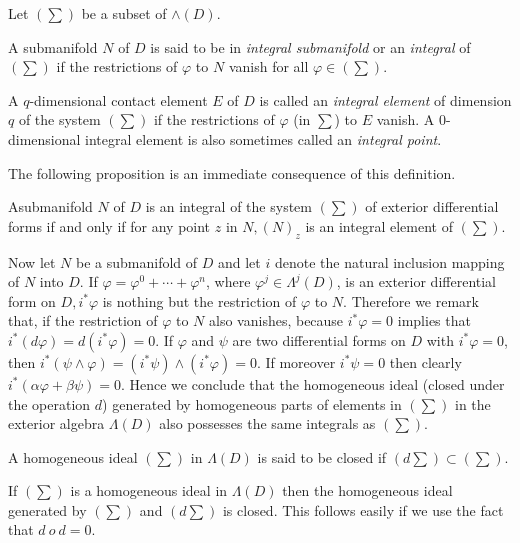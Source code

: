 Let $(\sum)$ be a subset of $\wedge (D)$.

\begin{defi*} %
  A submanifold $N$ of $D$ is said to be in {\em{integral
      submanifold}} or an {\em{integral}} of $(\sum)$ if the
  restrictions of $\varphi$ to $N$ vanish for all $\varphi \in
  (\sum)$. 
\end{defi*}

\begin{defi*}%
  A $q$-dimensional contact element $E$ of $D$ is called an
  {\em{integral element}} of dimension $q$ of the system $(\sum)$ if
  the restrictions of $\varphi $ (in $\sum$) to $E$ vanish. A
  0-dimensional integral element is also sometimes called an
  {\em{integral point}}.  
\end{defi*}

The following proposition is an immediate consequence of this definition.
\setcounter{proposition}{0}
\begin{proposition}\label{chap2:sec2.2:prop1}%
  A\pageoriginale submanifold $N$ of $D$ is an integral of the system $(\sum)$ of
  exterior differential forms if and only if for any point $z$ in $N,
  (N)_z$ is an integral element of $(\sum)$. 
\end{proposition}

Now let $N$ be a submanifold of $D$ and let $i$ denote the natural
inclusion mapping of $N$ into $D$. If $\varphi = \varphi^0 + \cdots +
\varphi^n$,  where $\varphi^j \in \Lambda^j (D)$,  is an exterior
differential form on $D,  i^* \varphi$ is nothing but the restriction
of $\varphi$ to $N$. Therefore we remark that,  if the restriction of
$\varphi$ to $N$ also  vanishes,  because $i^* \varphi = 0$ implies
that $i^* (d \varphi) = d(i^* \varphi) = 0$. If $\varphi$ and $\psi$
are two differential forms on $D$ with $i^* \varphi = 0$,  then $i^*
(\psi \wedge \varphi) = (i^* \psi ) \wedge (i^* \varphi) = 0$.  If
moreover $i^* \psi = 0$ then clearly $i^* (\alpha \varphi + \beta
\psi) = 0$. Hence we conclude that the homogeneous ideal (closed under
the operation $d$) generated by homogeneous parts of elements in
$(\sum)$ in the exterior algebra $\Lambda (D)$ also possesses the same
integrals as $(\sum)$. 

\begin{defi*}%
  A homogeneous ideal $(\sum)$ in $\Lambda(D)$ is said to be closed if
  $(d \sum) \subset (\sum)$. 
\end{defi*}

\begin{proposition}\label{chap2:sec2.2:prop2}%
  If $(\sum)$ is a homogeneous ideal in $\Lambda (D)$ then the
  homogeneous ideal generated by $(\sum)$ and $(d \sum) $ is
  closed. This follows easily if we use the fact that $d ~ o ~ d =
  0$. 
\end{proposition}

